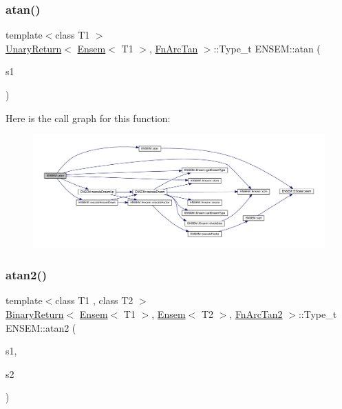 \subsubsection{\texorpdfstring{atan()}{atan()}}
{\footnotesize\ttfamily template$<$class T1 $>$ \\
\mbox{\hyperlink{structENSEM_1_1UnaryReturn}{Unary\+Return}}$<$ \mbox{\hyperlink{classENSEM_1_1Ensem}{Ensem}}$<$ T1 $>$, \mbox{\hyperlink{structENSEM_1_1FnArcTan}{Fn\+Arc\+Tan}} $>$\+::Type\+\_\+t E\+N\+S\+E\+M\+::atan (\begin{DoxyParamCaption}\item[{const \mbox{\hyperlink{classENSEM_1_1Ensem}{Ensem}}$<$ T1 $>$ \&}]{s1 }\end{DoxyParamCaption})\hspace{0.3cm}{\ttfamily [inline]}}

Here is the call graph for this function\+:\nopagebreak
\begin{figure}[H]
\begin{center}
\leavevmode
\includegraphics[width=350pt]{d1/d9e/group__eensem_gaa9d40be37b4214b6c8f1e94f6a52dea3_cgraph}
\end{center}
\end{figure}
\mbox{\label{group__eensem_ga4a9f9b7400c5d7cbbb6f6118ca6a3c47}} 
\subsubsection{\texorpdfstring{atan2()}{atan2()}\hspace{0.1cm}{\footnotesize\ttfamily [1/3]}}
{\footnotesize\ttfamily template$<$class T1 , class T2 $>$ \\
\mbox{\hyperlink{structENSEM_1_1BinaryReturn}{Binary\+Return}}$<$ \mbox{\hyperlink{classENSEM_1_1Ensem}{Ensem}}$<$ T1 $>$, \mbox{\hyperlink{classENSEM_1_1Ensem}{Ensem}}$<$ T2 $>$, \mbox{\hyperlink{structENSEM_1_1FnArcTan2}{Fn\+Arc\+Tan2}} $>$\+::Type\+\_\+t E\+N\+S\+E\+M\+::atan2 (\begin{DoxyParamCaption}\item[{const \mbox{\hyperlink{classENSEM_1_1Ensem}{Ensem}}$<$ T1 $>$ \&}]{s1,  }\item[{const \mbox{\hyperlink{classENSEM_1_1Ensem}{Ensem}}$<$ T2 $>$ \&}]{s2 }\end{DoxyParamCaption})\hspace{0.3cm}{\ttfamily [inline]}}



